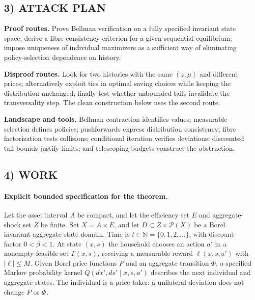 \documentclass[11pt,a4paper]{article}
\newcommand{\N}{\mathbb N}
\theoremstyle{definition}
\begin{document}
\subsection*{3) ATTACK PLAN}
\textbf{Proof routes.} Prove Bellman verification on a fully specified invariant state space; derive a fibre-consistency criterion for a given sequential equilibrium; impose uniqueness of individual maximizers as a sufficient way of eliminating policy-selection dependence on history.

\textbf{Disproof routes.} Look for two histories with the same $(z,\mu)$ and different prices; alternatively exploit ties in optimal saving choices while keeping the distribution unchanged; finally test whether unbounded tails invalidate the transversality step. The clean construction below uses the second route.

\textbf{Landscape and tools.} Bellman contraction identifies values; measurable selection defines policies; pushforwards express distribution consistency; fibre factorization tests collisions; conditional iteration verifies deviations; discounted tail bounds justify limits; and telescoping budgets construct the obstruction.

\subsection*{4) WORK}
\paragraph{Explicit bounded specification for the theorem.}
Let the asset interval $A$ be compact, and let the efficiency set $E$ and aggregate-shock set $Z$ be finite. Set $X=A\times E$, and let $D\subset Z\times\mathcal P(X)$ be a Borel invariant aggregate-state domain. Time is $t\in\N=\{0,1,2,\ldots\}$, with discount factor $0<\beta<1$. At state $(x,s)$ the household chooses an action $a'$ in a nonempty feasible set $\Gamma(x,s)$, receiving a measurable reward $\ell(x,s,a')$ with $|\ell|\le M$. Given Borel price functions $P$ and an aggregate transition $\Phi$, a specified Markov probability kernel $Q(dx',ds'\mid x,s,a')$ describes the next individual and aggregate states. The individual is a price taker: a unilateral deviation does not change $P$ or $\Phi$.
\end{document}
